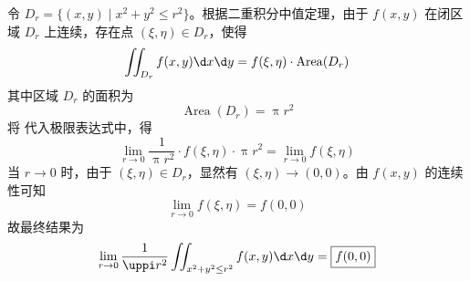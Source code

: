 \begin{solution}
    令 $D_r = \{ (x, y) \mid x^2 + y^2 \le r^2 \}$。根据二重积分中值定理，由于 $f(x, y)$ 在闭区域 $D_r$ 上连续，存在点 $(\xi, \eta) \in D_r$，使得
    \begin{equation}
        \iint_{D_r} f(x, y) \d x \d y = f(\xi, \eta) \cdot \operatorname{Area}(D_r) \label{eq:MVT}
    \end{equation}
    其中区域 $D_r$ 的面积为
    \begin{equation}
        \operatorname{Area}(D_r) = \uppi r^2
    \end{equation}
    将  代入极限表达式中，得
    \begin{equation}
        \lim_{r \to 0} \frac{1}{\uppi r^2} \cdot f(\xi, \eta) \cdot \uppi r^2 = \lim_{r \to 0} f(\xi, \eta)
    \end{equation}
    当 $r \to 0$ 时，由于 $(\xi, \eta) \in D_r$，显然有 $(\xi, \eta) \to (0, 0)$。由 $f(x, y)$ 的连续性可知
    \begin{equation}
        \lim_{r \to 0} f(\xi, \eta) = f(0, 0)
    \end{equation}
    故最终结果为
    \begin{equation}
        \lim_{r \to 0} \frac{1}{\uppi r^2} \iint_{x^2 + y^2 \le r^2} f(x, y) \d x \d y = \boxed{f(0, 0)}
    \end{equation}
\end{solution}

\endinput

